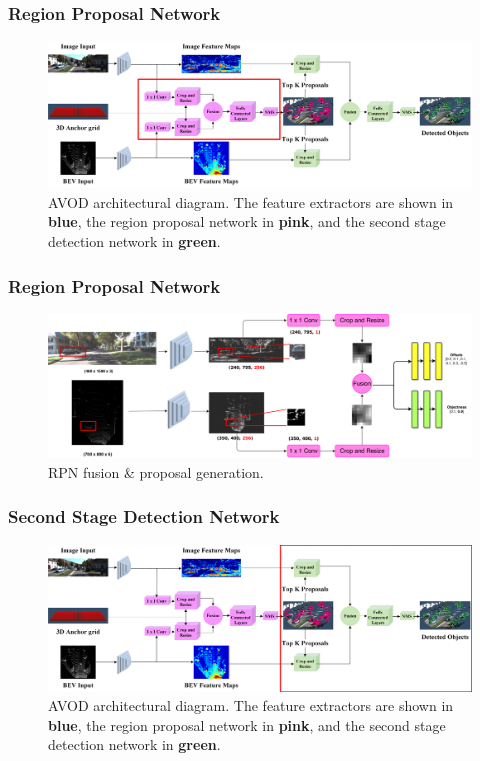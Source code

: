 \documentclass[10pt,fleqn,unknownkeysallowed]{beamer}
\begin{document}
\begin{frame}
	\frametitle{Region Proposal Network}
	\begin{figure}
		\begin{center}
			\includegraphics[width=115mm]{images/Meta-Architecture_3}
			\caption{AVOD architectural diagram. The feature extractors are shown in \textbf{blue}, the region proposal network in \textbf{pink}, and the second stage detection network in \textbf{green}.}
		\end{center}
	\end{figure}
\end{frame}	

\begin{frame}
	\frametitle{Region Proposal Network}
	\begin{figure}[H]
		\includegraphics[width=115mm]{images/pdfs/rpn_crop_resize}
		\caption{RPN fusion \& proposal generation.}
	\end{figure}
\end{frame}


\begin{frame}
	\frametitle{Second Stage Detection Network}
	\begin{figure}
		\begin{center}
			\includegraphics[width=115mm]{images/Meta-Architecture_4}
			\caption{AVOD architectural diagram. The feature extractors are shown in \textbf{blue}, the region proposal network in \textbf{pink}, and the second stage detection network in \textbf{green}.}
		\end{center}
	\end{figure}
\end{frame}	
\end{document}
